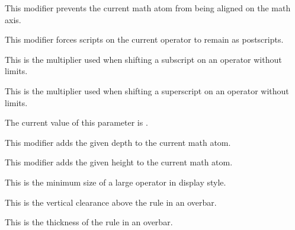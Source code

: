 \stopnewprimitive

\startnewprimitive[title={\prm {Umathnoaxis}}]

This modifier prevents the current math atom from being aligned on the math axis.

\stopnewprimitive

\startnewprimitive[title={\prm {Umathnolimits}}]

This modifier forces scripts on the current operator to remain as postscripts.

\stopnewprimitive

\startnewprimitive[title={\prm {Umathnolimitsubfactor}}]

This is the multiplier used when shifting a subscript on an operator without
limits.

\stopnewprimitive

\startnewprimitive[title={\prm {Umathnolimitsupfactor}}]

This is the multiplier used when shifting a superscript on an operator without
limits.

\stopnewprimitive

\startnewprimitive[title={\prm {Umathnumeratorvariant}}]

The current value of this parameter is \CurrentMathVariant \Umathnumeratorvariant.

\stopnewprimitive

\startnewprimitive[title={\prm {Umathopenupdepth}}]

This modifier adds the given depth to the current math atom.

\stopnewprimitive

\startnewprimitive[title={\prm {Umathopenupheight}}]

This modifier adds the given height to the current math atom.

\stopnewprimitive

\startnewprimitive[title={\prm {Umathoperatorsize}}]

This is the minimum size of a large operator in display style.

\stopnewprimitive

\startnewprimitive[title={\prm {Umathoverbarkern}}]

This is the vertical clearance above the rule in an overbar.

\stopnewprimitive

\startnewprimitive[title={\prm {Umathoverbarrule}}]

This is the thickness of the rule in an overbar.


